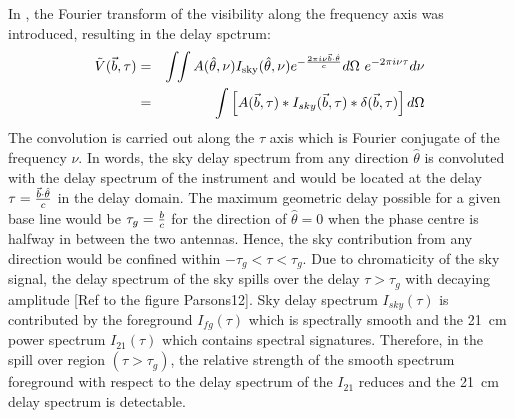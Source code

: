 \documentclass[12pt,preprint]{aastex}
\newcommand{\sky}{{\rm sky}}
\newcommand{\bm}{{A}}
\newcommand{\thhat}{{\hat\theta}}
\newcommand{\ifngexp}{{e^{-\frac{2\pi i\nu\vec{b}\cdot\thhat}{c}}}}
\begin{document}
In \citet{parsons_et_al2012a}, the Fourier transform of the visibility along the frequency axis was introduced,
resulting in the delay spctrum:
\begin{eqnarray}
\tilde V(\vec b, \tau) & = & \int\!\!\int{\bm(\thhat,\nu) I_\sky(\thhat,\nu) \ifngexp d\Omega~e^{-2\pi i\nu\tau}d\nu}\nonumber\\	                        & = &   \int \left [ A(\vec b, \tau)\ast I_{sky}(\vec b, \tau) \ast \delta( \vec b, \tau )\right ] d\Omega 
\label{eq3}
\end{eqnarray}
The convolution is carried out along the $\tau$ axis which is Fourier conjugate of the frequency $\nu$. In words, the sky delay spectrum from any direction $\thhat$ is convoluted with the delay spectrum of the instrument and would be located at the delay $\tau = {\vec b \cdot \thhat \over c}$ in the delay domain. The maximum geometric delay possible for a given base line would be $\tau_{g} ={ b \over c }$ for the direction of $\thhat = 0$ when the phase centre is halfway in between the two antennas. Hence, the sky contribution from any direction would be confined within $-\tau_{g}<\tau<\tau_{g}$. Due to chromaticity of the sky signal, the delay spectrum of the sky spills over the delay $\tau> \tau_{g}$ with decaying amplitude [Ref to the figure Parsons12]. Sky delay spectrum $I_{sky}(\tau)$ is contributed by the foreground  $I_{fg}(\tau)$  which is spectrally smooth and the 21~cm power spectrum $I_{21}(\tau)$ which contains spectral signatures. Therefore, in the spill over region $(\tau>\tau_{g})$, the relative strength of the smooth spectrum foreground with respect to the delay spectrum of the $I_{21}$ reduces and the 21~cm delay spectrum is detectable. 
\end{document}
